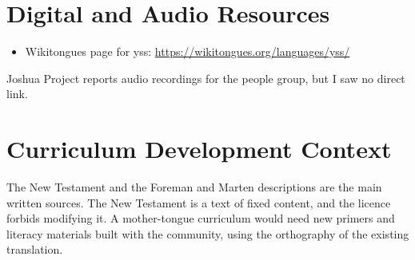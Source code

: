 \documentclass[12pt]{article}
\begin{document}
\section{Digital and Audio Resources}
\begin{itemize}
\item Wikitongues page for yss: \url{https://wikitongues.org/languages/yss/}
\end{itemize}
Joshua Project reports audio recordings for the people group, but I saw no direct link.

\section{Curriculum Development Context}
The New Testament and the Foreman and Marten descriptions are the main written sources. The New Testament is a text of fixed content, and the licence forbids modifying it. A mother-tongue curriculum would need new primers and literacy materials built with the community, using the orthography of the existing translation.
\end{document}
